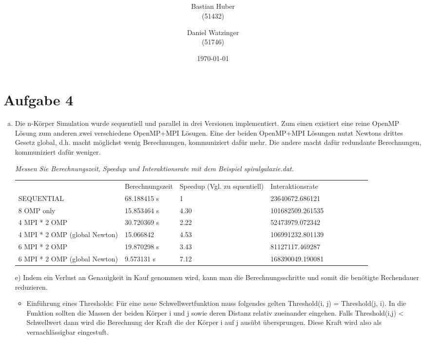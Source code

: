 \documentclass{article}
\author{Bastian Huber\\(51432) \and Daniel Watzinger\\(51746)}
\title{\textbf{\huge{\thetitle}}\\\Large\textsc{}\\\large\textsc{}}
\date{\today}
\begin{document}
\hyphenation{}

\maketitle

\pagestyle{fancy}

\section*{Aufgabe 4}
\begin{enumerate}[a)]
	\item
	Die n-Körper Simulation wurde sequentiell und parallel in drei Versionen implementiert. Zum einen existiert eine reine OpenMP Lösung zum anderen zwei verschiedene OpenMP+MPI Lösugen. Eine der beiden OpenMP+MPI Lösungen nutzt Newtons drittes Gesetz global, d.h. macht möglichst wenig Berechnungen, kommuniziert dafür mehr. Die andere macht dafür redundante Berechnungen, kommuniziert dafür weniger.
	
	\textit{Messen Sie Berechnungszeit, Speedup und Interaktionsrate mit dem Beispiel spiralgalaxie.dat.}
	\begin{center}
		\begin{tabular}{llllllllll}
			 	        	& Berechnungszeit & Speedup (Vgl. zu squentiell) & Interaktionsrate \\
			 SEQUENTIAL 	& 68.188415 s		  & 1		& 23640672.686121  \\
			 8 OMP only 		& 15.853464 s		  & 4.30		& 101682509.261535 \\
			 4 MPI * 2 OMP	& 30.720369 s		  &	2.22		& 52473979.072342	\\
			 4 MPI * 2 OMP (global Newton)	& 15.066842		  &	4.53		& 106991232.801139	\\
			 6 MPI * 2 OMP	& 19.870298	s	  &	3.43		& 81127117.469287	\\
			 6 MPI * 2 OMP (global Newton)	& 9.573131 s		  &	7.12		& 168390049.190081	\\		 
		\end{tabular}
		\label{tab:}
	\end{center}
	
	\item[e)]
	Indem ein Verlust an Genauigkeit in Kauf genommen wird, kann man die Berechnungsschritte
	und somit die benötigte Rechendauer reduzieren.
	\begin{itemize}
		\item Einführung eines Thresholds: Für eine neue Schwellwertfunktion muss folgendes
	gelten Threshold(i, j) =  Threshold(j, i). In die Funktion sollten die Massen der beiden
	Körper i und j sowie deren Distanz relativ zueinander eingehen.
	Falls Threshold(i,j) < Schwellwert dann wird die Berechnung der Kraft die der Körper
	i auf j ausübt übersprungen. Diese Kraft
	wird also als vernachlässigbar eingestuft.
	

\end{itemize}
\end{enumerate}
\end{document}
